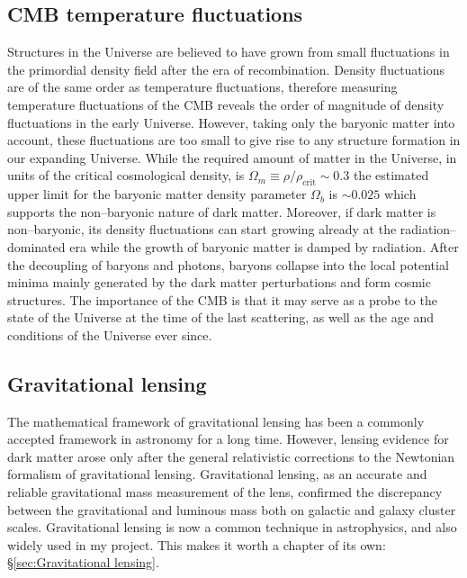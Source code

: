 \documentclass[a4wide,12pt]{book}
\begin{document}
\subsection{CMB temperature fluctuations}
\label{subsec:CMB}
Structures in the Universe are believed to have grown from small fluctuations in the primordial density field after the era of recombination. Density fluctuations are of the same order as temperature fluctuations, therefore measuring temperature fluctuations of the CMB reveals the order of magnitude of density fluctuations in the early Universe. However, taking only the baryonic matter into account, these fluctuations are too small to give rise to any structure formation in our expanding Universe. While the required amount of matter in the Universe, in units of the critical cosmological density, is $\Omega_m \equiv \rho/\rho_\mathrm{crit}\sim 0.3$ the estimated upper limit for the baryonic matter density parameter $\Omega_b$ is $ \sim 0.025$ \citep[][]{Planck2015} which supports the non--baryonic nature of dark matter. Moreover, if dark matter is non--baryonic, its density fluctuations can start growing already at the radiation--dominated era while the growth of baryonic matter is damped by radiation. After the decoupling of baryons and photons, baryons collapse into the local potential minima mainly generated by the dark matter perturbations and form cosmic structures. The importance of the CMB is that it may serve as a probe to the state of the Universe at the time of the last scattering, as well as the age and conditions of the Universe ever since.

\subsection{Gravitational lensing}
The mathematical framework of gravitational lensing has been a commonly accepted framework in astronomy for a long time. However, lensing evidence for dark matter arose only after the general relativistic corrections to the Newtonian formalism of gravitational lensing. Gravitational lensing, as an accurate and reliable gravitational mass measurement of the lens, confirmed the discrepancy between the gravitational and luminous mass both on galactic and galaxy cluster scales. Gravitational lensing is now a common technique in astrophysics, and also widely used in my project. This makes it worth a chapter of its own: \S \ref{sec:Gravitational lensing}.
\end{document}
